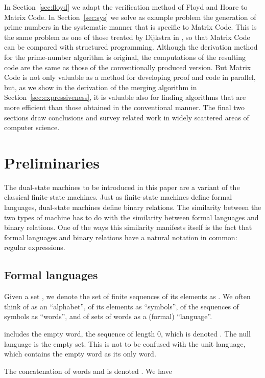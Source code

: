 \documentclass[preprint,11pt]{elsarticle}
\begin{document}
In Section~\ref{sec:floyd} we
adapt the verification method of Floyd and Hoare to
Matrix Code.
In Section~\ref{sec:sys}
we solve as example problem the generation of prime numbers
in the systematic manner that is specific to Matrix Code.
This is the same problem as one of those treated by Dijkstra
in \cite{djkddh72},
so that Matrix Code can be compared with structured programming.
Although the derivation method for the prime-number
algorithm is original,
the computations of the resulting code are the same
as those of the conventionally produced version.
But Matrix Code is not only valuable as a method
for developing proof and code in parallel,
but, as we show in the derivation of the merging algorithm
in Section~\ref{sec:expressiveness},
it is valuable also
for finding algorithms that are more efficient
than those obtained in the conventional manner.
The final two sections
draw conclusions and survey related work
in widely scattered areas of computer science.

\section{Preliminaries}
\label{sec:prelim}

The dual-state machines to be introduced in this paper
are a variant of the classical finite-state machines.
Just as finite-state machines define formal languages,
dual-state machines define binary relations.
The similarity between the two types of machine
has to do with the similarity between formal languages
and binary relations.
One of the ways this similarity manifests itself
is the fact that formal languages and binary relations
have a natural notation in common: regular expressions.

\subsection{Formal languages}
Given a set , we denote the set of finite sequences
of its elements as .
We often think of  as an ``alphabet'',
of its elements as ``symbols'',
of the sequences of symbols as ``words'',
and of sets of words as a (formal) ``language''.

 includes the empty word,
the sequence of length 0, which is denoted .
The null language is the empty set.
This is not to be confused with the unit language,
which contains the empty word as its only word.

The concatenation of words  and  is denoted 
.
We have
\end{document}
